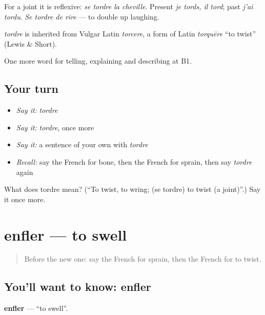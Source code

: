 For a joint it is reflexive: \emph{se tordre la cheville}. Present \emph{je tords, il tord}; past \emph{j'ai tordu}. \emph{Se tordre de rire} — to double up laughing.

\begin{cousinweb}
\emph{tordre} is inherited from Vulgar Latin \emph{torcere}, a form of Latin \emph{torquēre} \textquotedblleft{}to twist\textquotedblright{} (Lewis \& Short).
\end{cousinweb}

\begin{grammarlens}[title={What you've built}]
One more word for telling, explaining and describing at B1.
\end{grammarlens}

\subsection*{Your turn}
\begin{itemize}
\raggedright
  \item \emph{Say it:} \emph{tordre}
  \item \emph{Say it:} \emph{tordre}, once more
  \item \emph{Say it:} a sentence of your own with \emph{tordre}
  \item \emph{Recall:} say the French for bone, then the French for sprain, then say \emph{tordre} again
\end{itemize}

\begin{tcolorbox}[breakable,colback=teal!4,colframe=teal!35!black,title={Before you move on}]
What does tordre mean? (\textquotedblleft{}To twist, to wring; (se tordre) to twist (a joint)\textquotedblright{}.) Say it once more.
\end{tcolorbox}
\section[enfler]{enfler — to swell}

\label{lesson:FR-C481-enfler}



\begin{quote}
Before the new one: say the French for sprain, then the French for to twist.
\end{quote}

\subsection*{You'll want to know: enfler}
\textbf{enfler} — \textquotedblleft{}to swell\textquotedblright{}.

